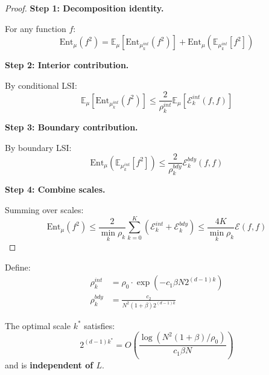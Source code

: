 \begin{proof}
\textbf{Step 1: Decomposition identity.}

For any function $f$:
\begin{equation}
\mathrm{Ent}_\mu(f^2) = \mathbb{E}_\mu[\mathrm{Ent}_{\mu^{int}_k}(f^2)] + \mathrm{Ent}_\mu(\mathbb{E}_{\mu^{int}_k}[f^2])
\end{equation}

\textbf{Step 2: Interior contribution.}

By conditional LSI:
\begin{equation}
\mathbb{E}_\mu[\mathrm{Ent}_{\mu^{int}_k}(f^2)] \leq \frac{2}{\rho_k^{int}} \mathbb{E}_\mu[\mathcal{E}^{int}_k(f, f)]
\end{equation}

\textbf{Step 3: Boundary contribution.}

By boundary LSI:
\begin{equation}
\mathrm{Ent}_\mu(\mathbb{E}_{\mu^{int}_k}[f^2]) \leq \frac{2}{\rho_k^{bdy}} \mathcal{E}^{bdy}_k(f, f)
\end{equation}

\textbf{Step 4: Combine scales.}

Summing over scales:
\begin{equation}
\mathrm{Ent}_\mu(f^2) \leq \frac{2}{\min_k \rho_k} \sum_{k=0}^K (\mathcal{E}^{int}_k + \mathcal{E}^{bdy}_k) 
\leq \frac{4K}{\min_k \rho_k} \mathcal{E}(f, f)
\end{equation}
\end{proof}

\begin{theorem}
\label{thm:optimal-scale-selection}
Define:
\begin{align}
\rho_k^{int} &= \rho_0 \cdot \exp(-c_1 \beta N 2^{(d-1)k}) \\
\rho_k^{bdy} &= \frac{c_2}{N^2(1+\beta) 2^{(d-1)k}}
\end{align}

The optimal scale $k^*$ satisfies:
\begin{equation}
2^{(d-1)k^*} = O\left(\frac{\log(N^2(1+\beta)/\rho_0)}{c_1 \beta N}\right)
\end{equation}
and is \textbf{independent of $L$}.
\end{theorem}

